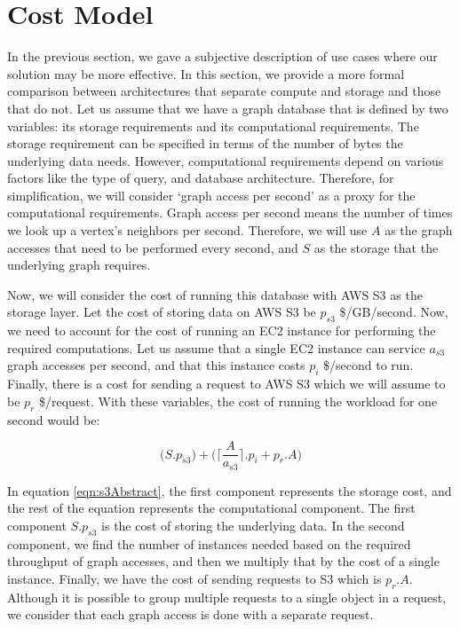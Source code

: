 \section{Cost Model}\label{sec:costModel}
In the previous section, we gave a subjective description of use cases where
our solution may be more effective. In this section, we provide a
more formal comparison between architectures that separate
compute and storage and those that do not. Let us assume that we
have a graph database that is defined by two variables: its storage requirements and
its computational requirements. The storage requirement can be specified in
terms of the number of bytes the underlying data needs. However,
computational requirements depend on various factors like the type of query,
and database architecture. Therefore, for simplification, we will consider
`graph access per second' as a proxy for the computational requirements. Graph
access per second means the number of times we look up a vertex's
neighbors per second. Therefore, we will use $A$ as the graph accesses that
need to be performed every second, and $S$ as the storage that the underlying
graph requires.

\smallskip
Now, we will consider the cost of running this database with AWS S3 as the
storage layer. Let the cost of storing data on AWS S3 be $p_{s3}$ \$/GB/second. Now,
we need to account for the cost of running an EC2 instance for performing
the required computations. Let us assume that a single EC2 instance can service
$a_{s3}$ graph accesses per second, and that this instance costs $p_{i}$
\$/second to run. Finally, there is a cost for sending a request to AWS S3 which
we will assume to be $p_r$ \$/request. With these variables, the cost of
running the workload for one second would be:

\begin{equation}
    \label{eqn:s3Abstract}
    \bigl(S.p_{s3}\bigr) + \bigl(\Bigg\lceil \frac{A}{a_{s3}} \Bigg\rceil . p_i + p_r.A\bigr)
\end{equation}

In equation \ref{eqn:s3Abstract}, the first component represents the storage
cost, and the rest of the equation represents the computational component. The
first component $S.p_{s3}$ is the cost of storing the underlying data. In the
second component, we find the number of instances needed based on
the required throughput of graph accesses, and then we multiply that by the
cost of a single instance. Finally, we have the cost of sending requests to S3
which is $p_r.A$. Although it is possible to group multiple requests to a single
object in a request, we consider that each graph access is done with a separate
request.

